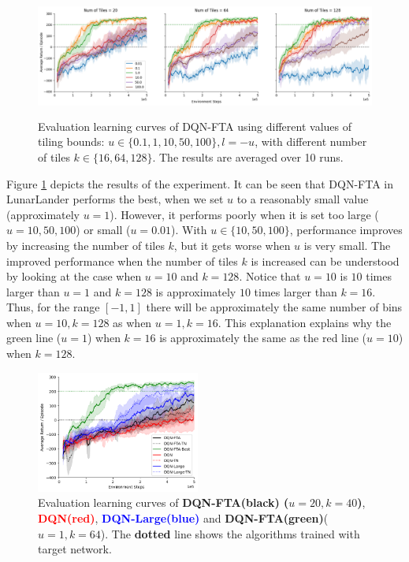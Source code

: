 \documentclass{article}
\begin{document}
\begin{figure}[h]
    \centering
    \includegraphics[height=4cm]{sweepfta.png}
    \caption{Evaluation learning curves of DQN-FTA using different values of tiling bounds: $u \in \{0.1, 1, 10, 50, 100\}, l = -u$, 
    with different number of tiles $k \in \{16, 64, 128\}$. The results are averaged over 10 runs.}
    \label{fig:sweepfta}
\end{figure}

Figure \ref{fig:sweepfta} depicts the results of the experiment.
It can be seen that DQN-FTA in LunarLander performs the best, when we set $u$ to a reasonably small value (approximately $u = 1$).
However, it performs poorly when it is set too large ($u=10, 50, 100$) or small ($u=0.01$).
With $u \in \{10, 50, 100\}$, performance improves by increasing the number of tiles $k$, but it gets worse when $u$ is very small.
The improved performance when the number of tiles $k$ is increased can be understood by looking at the case when $u=10$ and $k=128$.
Notice that $u=10$ is $10$ times larger than $u=1$ and $k=128$ is approximately $10$ times larger than $k=16$.
Thus, for the range $[-1, 1]$ there will be approximately the same number of bins when $u=10, k=128$ as when $u=1, k=16$.
This explanation explains why the green line ($u=1$) when $k=16$ is approximately the same as the red line ($u=10$) when $k=128$.

\begin{figure}[h]
    \centering
    \includegraphics[height=4cm]{bestfta.png}
    \caption{Evaluation learning curves of {\bf DQN-FTA(black) ($u=20, k = 40$)}, {\textcolor{red} {\bf DQN(red)}},  {\textcolor{blue} {\bf DQN-Large(blue)}} and {\textcolor{mygreen} {\bf DQN-FTA(green)}($u=1, k=64$)}. The {\bf dotted} line shows the algorithms trained with target network.}
    \label{fig:bestfta}
\end{figure}
\end{document}

